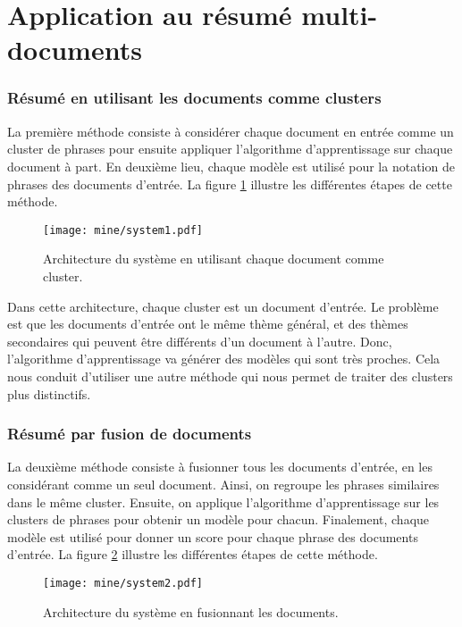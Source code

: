 \documentclass[a4paper,12pt,oneside]{../use/ESIthesis}
\begin{document}
\section{Application au résumé multi-documents}

\subsubsection{Résumé en utilisant les documents comme clusters}

La première méthode consiste à considérer chaque document en entrée comme un cluster de phrases pour ensuite appliquer l'algorithme d'apprentissage sur chaque document à part. 
En deuxième lieu, chaque modèle est utilisé pour la notation de phrases des documents d'entrée.
La figure \ref{fig:system1} illustre les différentes étapes de cette méthode. 
%
\begin{figure}[!ht]
\begin{center}
\texttt{[image: mine/system1.pdf]} %
\caption{Architecture du système en utilisant chaque document comme cluster.}
\label{fig:system1}
\end{center}
\end{figure}

Dans cette architecture, chaque cluster est un document d'entrée. 
Le problème est que les documents d'entrée ont le même thème général, et des thèmes secondaires qui peuvent être différents d'un document à l'autre. 
Donc, l'algorithme d'apprentissage va générer des modèles qui sont très proches. 
Cela nous conduit d'utiliser une autre méthode qui nous permet de traiter des clusters plus distinctifs.

\subsubsection{Résumé par fusion de documents}

La deuxième méthode consiste à fusionner tous les documents d'entrée, en les considérant comme un seul document. 
Ainsi, on regroupe les phrases similaires dans le même cluster. 
Ensuite, on applique l'algorithme d'apprentissage sur les clusters de phrases pour obtenir un modèle pour chacun. 
Finalement, chaque modèle est utilisé pour donner un score pour chaque phrase des documents d'entrée.
La figure \ref{fig:system2} illustre les différentes étapes de cette méthode. 
%
\begin{figure}[!ht]
\begin{center}
\texttt{[image: mine/system2.pdf]} %
\caption{Architecture du système en fusionnant les documents.}
\label{fig:system2}
\end{center}
\end{figure}
\end{document}
